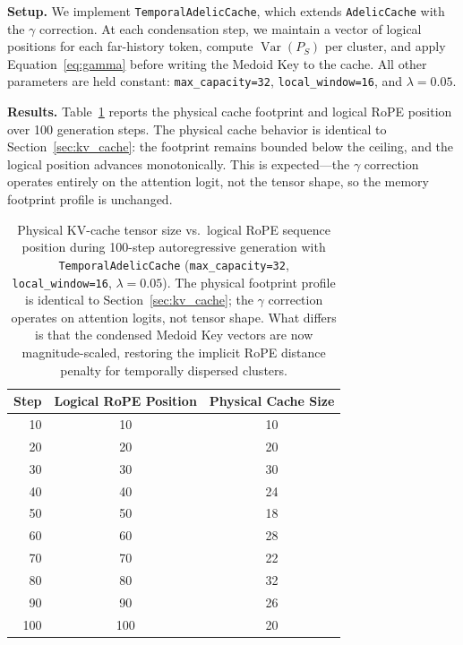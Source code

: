\documentclass[11pt,a4paper]{article}
\begin{document}
\textbf{Setup.} We implement \texttt{TemporalAdelicCache}, which extends \texttt{AdelicCache} with the $\gamma$ correction. At each condensation step, we maintain a vector of logical positions for each far-history token, compute $\operatorname{Var}(P_S)$ per cluster, and apply Equation~\eqref{eq:gamma} before writing the Medoid Key to the cache. All other parameters are held constant: \texttt{max\_capacity=32}, \texttt{local\_window=16}, and $\lambda = 0.05$.

\textbf{Results.} Table~\ref{tab:temporal_decay} reports the physical cache footprint and logical RoPE position over 100 generation steps. The physical cache behavior is identical to Section~\ref{sec:kv_cache}: the footprint remains bounded below the ceiling, and the logical position advances monotonically. This is expected---the $\gamma$ correction operates entirely on the attention logit, not the tensor shape, so the memory footprint profile is unchanged.

\begin{table}[h]
\centering
\caption{Physical KV-cache tensor size vs.\ logical RoPE sequence position during 100-step autoregressive generation with \texttt{TemporalAdelicCache} (\texttt{max\_capacity=32}, \texttt{local\_window=16}, $\lambda=0.05$). The physical footprint profile is identical to Section~\ref{sec:kv_cache}; the $\gamma$ correction operates on attention logits, not tensor shape. What differs is that the condensed Medoid Key vectors are now magnitude-scaled, restoring the implicit RoPE distance penalty for temporally dispersed clusters.}
\label{tab:temporal_decay}
\begin{tabular}{@{}rcc@{}}
\toprule
Step & Logical RoPE Position & Physical Cache Size \\
\midrule
10  & 10  & 10 \\
20  & 20  & 20 \\
30  & 30  & 30 \\
40  & 40  & 24 \\
50  & 50  & 18 \\
60  & 60  & 28 \\
70  & 70  & 22 \\
80  & 80  & 32 \\
90  & 90  & 26 \\
100 & 100 & 20 \\
\bottomrule
\end{tabular}
\end{table}
\end{document}
